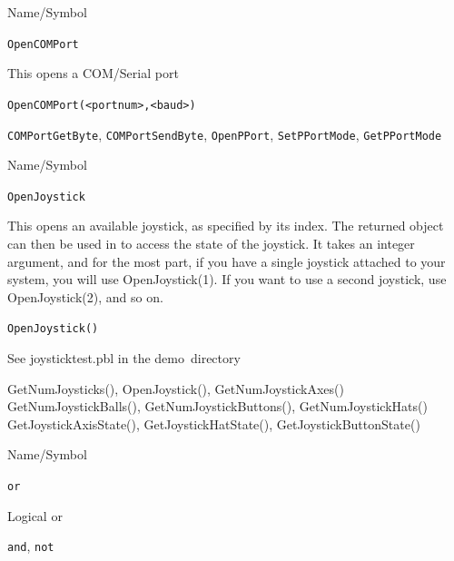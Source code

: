 \vfill
\newpage
{}
\vfill


\begin{desc}{Name/Symbol}
\item[Name/Symbol] \verb+OpenCOMPort+ 

\item[Description]  
  This opens a COM/Serial port
\item[Usage]       
     \verb+OpenCOMPort(<portnum>,<baud>)+ 

\item[Example]

\item[See Also]
\verb+COMPortGetByte+, \verb+COMPortSendByte+, \verb+OpenPPort+, \verb+SetPPortMode+, \verb+GetPPortMode+ 
\end{desc} 




\begin{desc}{Name/Symbol}
\item[Name/Symbol] \verb+OpenJoystick+ 

\item[Description]  
  This opens an available joystick, as specified by its index.  The returned object can then be used in to access the state of the joystick.  It takes an integer argument, and for the most part, if you have a single joystick attached to your system, you will use OpenJoystick(1).  If you want to use a second joystick, use OpenJoystick(2), and so on.
  
  \item[Usage]          \verb+OpenJoystick()+ 

\item[Example]
See joysticktest.pbl in the demo\ directory

\item[See Also]
GetNumJoysticks(), OpenJoystick(), GetNumJoystickAxes()
GetNumJoystickBalls(), GetNumJoystickButtons(), GetNumJoystickHats()
GetJoystickAxisState(), GetJoystickHatState(), GetJoystickButtonState()
\end{desc} 


\begin{desc}{Name/Symbol}
\item[Name/Symbol]	\verb+or+                   

\item[Description]	Logical or

\item[Usage]		

\item[Example]	

\item[See Also]	\verb+and+, \verb+not+
\end{desc}



